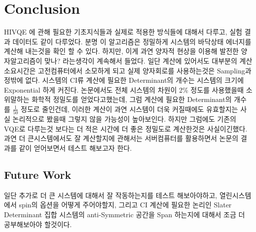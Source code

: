\documentclass[11pt]{article}
\begin{document}
\section{Conclusion}
HIVQE 에 관해 필요한 기초지식들과 실제로 적용한 방식들에 대해서 다루고, 실험 결과 데이터도 같이 다루었다. 
분명 이 알고리즘은 정밀하게 시스템의 바닥상태 에너지를 계산해 내는것을 확인 할 수 있다. 하지만, 이게 과연 양자적 현상을 이용해 발전한 양자알고리즘이 맞나? 라는생각이 계속해서 들었다. 
일단 계산에 있어서도 대부분의 계산소요시간은 고전컴퓨터에서 소모하게 되고 실제 양자회로를 사용하는것은 Sampling과정밖에 없다. 
시스템의 CI류 계산에 필요한 Determinant의 개수는 시스템의 크기에 Exponential 하게 커진다. 논문에서도 전체 시스템의 차원이 2\% 정도를 사용했을때 소위말하는 화학적 정밀도를 얻었다고했는데, 
그럼 계산에 필요한 Determinant의 개수를 \(\frac{1}{50}\) 정도로 줄인건데, 이러한 계산이 과연 시스템이 더욱 커질때에도 유효할지는 사실 논리적으로 봤을때 그렇지 않을 가능성이 높아보인다. 
하지만 그럼에도 기존의 VQE로 다루는것 보다는 더 적은 시간에 더 좋은 정밀도로 계산한것은 사실이긴했다. 과연 더 큰시스템에서도 잘 계산할지에 관해서는 서버컴퓨터를 활용하면서 논문의 결과를 같이 얻어보면서 테스트 해보고자 한다. 
\subsection{Future Work}
일단 추가로 더 큰 시스템에 대해서 잘 작동하는지를 테스트 해보아야하고, 열린시스템에서 spin의 옵션을 어떻게 주어야할지, 그리고 CI 계산에 필요한 논리인 Slater Determinant 집합 시스템의 anti-Symmetric 공간을
Span 하는지에 대해서 조금 더 공부해보아야 할것이다. 
\end{document}
